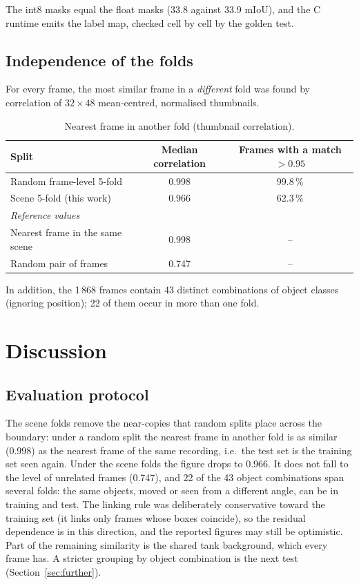 \documentclass[11pt,a4paper]{article}
\begin{document}
The int8 masks equal the float masks (33.8 against 33.9 mIoU), and the C
runtime emits the label map, checked cell by cell by the golden test.

\subsection{Independence of the folds}
\label{sec:independence}

For every frame, the most similar frame in a \emph{different} fold was found
by correlation of $32 \times 48$ mean-centred, normalised thumbnails.

\begin{table}[H]
\centering
\caption{Nearest frame in another fold (thumbnail correlation).}
\label{tab:indep}
\begin{tabular}{lcc}
\toprule
Split & Median correlation & Frames with a match $> 0.95$ \\
\midrule
Random frame-level 5-fold & 0.998 & 99.8\,\% \\
Scene 5-fold (this work) & 0.966 & 62.3\,\% \\
\midrule
\multicolumn{3}{l}{\emph{Reference values}} \\
Nearest frame in the same scene & 0.998 & -- \\
Random pair of frames & 0.747 & -- \\
\bottomrule
\end{tabular}
\end{table}

In addition, the 1\,868 frames contain 43 distinct combinations of object
classes (ignoring position); 22 of them occur in more than one fold.

\section{Discussion}

\subsection{Evaluation protocol}

The scene folds remove the near-copies that random splits place across the
boundary: under a random split the nearest frame in another fold is as
similar (0.998) as the nearest frame of the same recording, i.e.\ the test
set is the training set seen again. Under the scene folds the figure drops
to 0.966. It does not fall to the level of unrelated frames (0.747), and 22
of the 43 object combinations span several folds: the same objects, moved or
seen from a different angle, can be in training and test. The linking rule
was deliberately conservative toward the training set (it links only
frames whose boxes coincide), so the residual dependence is in this
direction, and the reported figures may still be optimistic. Part of the
remaining similarity is the shared tank background, which every frame has.
A stricter grouping by object combination is the next test
(Section~\ref{sec:further}).
\end{document}

